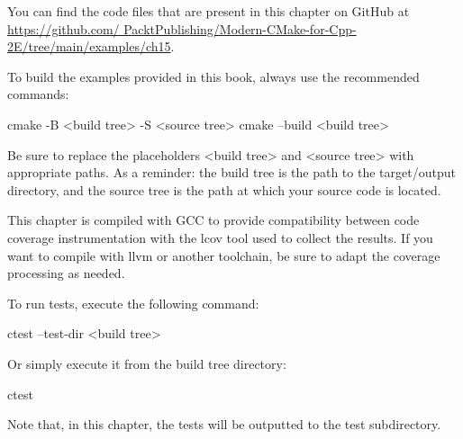 You can find the code files that are present in this chapter on GitHub at \url{https://github.com/ PacktPublishing/Modern-CMake-for-Cpp-2E/tree/main/examples/ch15}.

To build the examples provided in this book, always use the recommended commands:

\begin{shell}
cmake -B <build tree> -S <source tree>
cmake --build <build tree>
\end{shell}

Be sure to replace the placeholders <build tree> and <source tree> with appropriate paths.
As a reminder: the build tree is the path to the target/output directory, and the source tree is the path at which your source code is located.

This chapter is compiled with GCC to provide compatibility between code coverage instrumentation with the lcov tool used to collect the results. If you want to compile with llvm or another toolchain, be sure to adapt the coverage processing as needed.

To run tests, execute the following command:

\begin{shell}
ctest --test-dir <build tree>
\end{shell}

Or simply execute it from the build tree directory:

\begin{shell}
ctest
\end{shell}

Note that, in this chapter, the tests will be outputted to the test subdirectory.
















